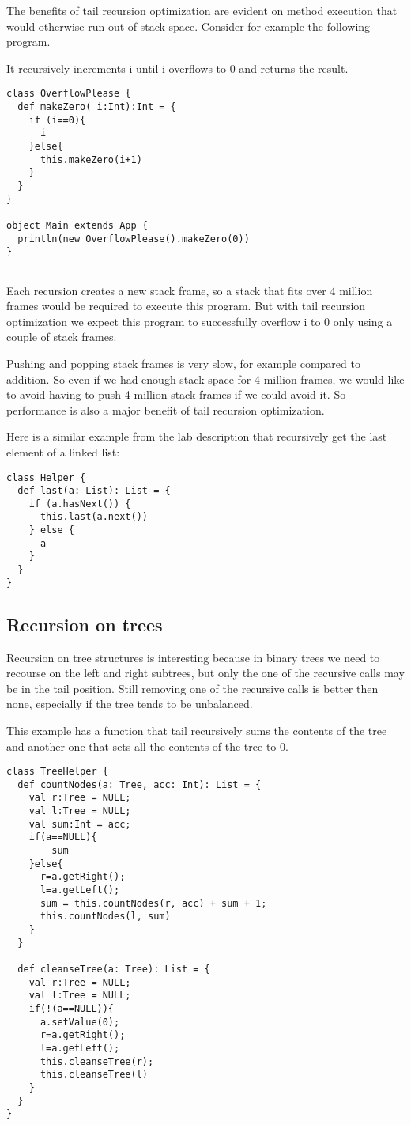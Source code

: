 The benefits of tail recursion optimization are evident on  method execution that would otherwise run out of stack space. Consider for example the following program.

It recursively increments i until i overflows to 0 and returns the result.
\begin{lstlisting}
class OverflowPlease {
  def makeZero( i:Int):Int = {
    if (i==0){
      i
    }else{
      this.makeZero(i+1)
    }
  }
}

object Main extends App {
  println(new OverflowPlease().makeZero(0))
}


\end{lstlisting}

Each recursion creates a new stack frame, so a stack that fits over 4 million frames would be required to execute this program. But with tail recursion optimization we expect this program to successfully overflow i to 0 only using a couple of stack frames.

Pushing and popping stack frames is very slow, for example compared to addition. So even if we had enough stack space for 4 million frames, we would like to avoid having to push 4 million stack frames if we could avoid it. So performance is also a major benefit of tail recursion optimization.


Here is a similar example from the lab description that recursively get the last element of a linked list:

\begin{lstlisting}
class Helper {
  def last(a: List): List = {
    if (a.hasNext()) {
      this.last(a.next())
    } else {
      a
    }
  }
}
\end{lstlisting}

\subsection{Recursion on trees}

Recursion on tree structures is interesting because in binary trees we need to recourse on the left and right subtrees, but only the one of the recursive calls may be in the tail position. Still removing one of the recursive calls is better then none, especially if the tree tends to be unbalanced.

This example has a function that tail recursively sums the contents of the tree and another one that sets all the contents of the tree to 0.

\begin{lstlisting}
class TreeHelper {
  def countNodes(a: Tree, acc: Int): List = {
    val r:Tree = NULL;
    val l:Tree = NULL;
    val sum:Int = acc;
    if(a==NULL){
        sum
    }else{
      r=a.getRight();
      l=a.getLeft();
      sum = this.countNodes(r, acc) + sum + 1;
      this.countNodes(l, sum)
    }
  }
  
  def cleanseTree(a: Tree): List = {
    val r:Tree = NULL;
    val l:Tree = NULL;
    if(!(a==NULL)){
      a.setValue(0);
      r=a.getRight();
      l=a.getLeft();
      this.cleanseTree(r);
      this.cleanseTree(l)
    }
  }
}
\end{lstlisting}

